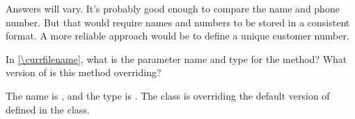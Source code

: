 \begin{answer}
Answers will vary.
It's probably good enough to compare the name and phone number.
But that would require names and numbers to be stored in a consistent format.
A more reliable approach would be to define a unique customer number.
\end{answer}


\Q In \ref{\currfilename}, what is the parameter name and type for the  method?
What version of  is this method overriding?

\begin{answer}
The name is , and the type is .
The  class is overriding the default version of  defined in the  class.
\end{answer}

